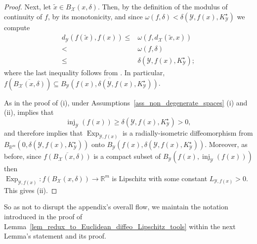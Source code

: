 \documentclass[anon,12pt]{colt2021} %
\newcommand{\rr}{{\mathbb{R}}}
\newcommand{\rrflex}[1]{{\ensuremath{\rr^{#1}
}}}
\newcommand{\rrm}{{\rrflex{m}}}
\newcommand{\xxx}{\mathcal{X}}
\newcommand{\yyy}{\mathcal{Y}}
\begin{document}
\begin{proof}
Next, let $\tilde{x}\in B_{\xxx}(x,\delta)$.  Then, by the definition of the modulus of continuity of $f$, by its monotonicity, and since $\omega(f,\delta)<\delta(\yyy,f(x),K_{\yyy}^{\star})$ we compute
\begin{equation}
    \begin{aligned}
        d_{\yyy}\left(
        f(\tilde{x}),f(x)
        \right)
        \leq &
        \omega\left(
        f,
        d_{\xxx}\left(
        \tilde{x},x
        \right)
        \right)
        \\
        <&
        \omega\left(
        f,\delta
        \right)
        \\
        \leq &
        \delta(\yyy,f(x),K_{\yyy}^{\star})
        ;
    \end{aligned}
    \label{eq_push_bound}
\end{equation}
where the last inequality follows from \citep[Proposition 1 (5)]{EmbrechtsHofert}.  
In particular, $f\left(\overline{B_{\xxx}(x,\delta)}\right)\subseteq \overline{B_{\yyy}\left(
f(x),\delta(\yyy,f(x),K_{\yyy}^{\star})
\right)}$.

As in the proof of (i), under Assumptions~\ref{ass_non_degenerate_spaces} (i) and (ii), \citep[Theorem 4.7]{CheegerGromovTaylorTheorem1982} implies that 
$$
\operatorname{inj}_{\yyy}(f(x)) \geq \delta(\yyy,f(x),K_{\yyy}^{\star}) >0,
$$
and therefore \citep[Corollaries 1.7.1 and 1.4.2]{jost2008riemannian} implies that $\operatorname{Exp}_{\yyy,f(x)}$ is a radially-isometric diffeomorphism from $B_{\rrm}(0,\delta(\yyy,f(x),K_{\yyy}^{\star}))$ onto $B_{\yyy}(f(x),\delta(\yyy,f(x),K_{\yyy}^{\star}))$.  Moreover, as before, since $\overline{f(B_{\xxx}(x,\delta))}$ is a compact subset of $B_{\yyy}(f(x),\operatorname{inj}_{\yyy}(f(x)))$ then\\ $\operatorname{Exp}_{\yyy,f(x)}:f(B_{\xxx}(x,\delta)) \rightarrow \rrm$ is Lipschitz with some constant $L_{\yyy,f(x)}>0$.  This gives (ii).  
\end{proof}
So as not to disrupt the appendix's overall flow, we maintain the notation introduced in the proof of Lemma~\ref{lem_redux_to_Euclidean_diffeo_Lipschitz_tools} within the next Lemma's statement and its proof.  
\end{document}
